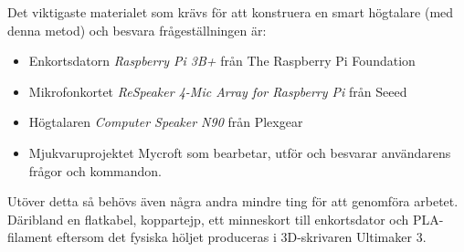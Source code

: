 Det viktigaste materialet som krävs för att konstruera en smart högtalare (med denna metod) och besvara frågeställningen är:
\begin{itemize}
\item Enkortsdatorn \textit{Raspberry Pi 3B+ } från The Raspberry Pi Foundation
\item Mikrofonkortet \textit{ReSpeaker 4-Mic Array for Raspberry Pi } från Seeed
\item Högtalaren \textit{Computer Speaker N90 }från Plexgear
\item Mjukvaruprojektet Mycroft som bearbetar, utför och besvarar användarens frågor och kommandon.
\end{itemize}
Utöver detta så behövs även några andra mindre ting för att genomföra arbetet. Däribland en flatkabel, koppartejp, ett minneskort till enkortsdator och PLA-filament eftersom det fysiska höljet produceras i 3D-skrivaren Ultimaker 3.
